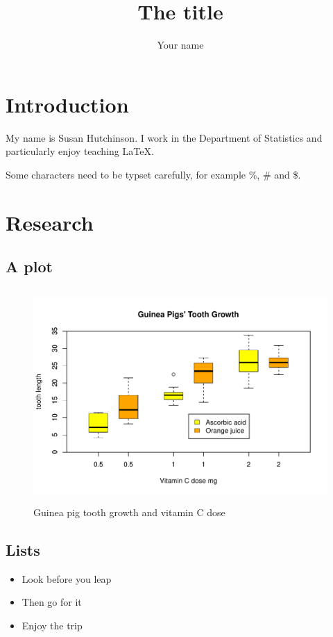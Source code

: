 \documentclass[a4paper,11pt]{article}
\title{The title}
\author{Your name}
\begin{document}
\maketitle
\thispagestyle{empty}
\newpage
{}

\section{Introduction}
My name is Susan Hutchinson. I work in the Department of Statistics and 
particularly enjoy teaching LaTeX. 

Some characters need to be typset carefully, for example \%, \# and \$.

\section{Research}

\subsection{A plot}
\begin{figure}[htb]
\centering
\includegraphics[width=4.8in, height=3.2in]{GuineaPigPlot.pdf}
\caption{Guinea pig tooth growth and vitamin C dose}
\label{fig:GPPlot}
\end{figure}

\subsection{Lists}
\begin{itemize}
\item Look before you leap
\item Then go for it
\item Enjoy the trip
\end{itemize}
\end{document}
